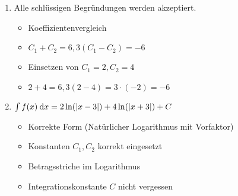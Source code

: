 \item
	\begin{enumerate}
	
	\item Alle schlüssigen Begründungen werden akzeptiert.
		\begin{itemize}
			\item Koeffizientenvergleich
			\item $C_1+C_2 = 6, 3(C_1-C_2)=-6$
			\item Einsetzen von $C_1=2, C_2 = 4$
			\item $2+4=6, 3(2-4)=3\cdot(-2)=-6$
		\end{itemize}
	
	\item $\int f(x) \:\mathrm{d}{x} = 2 \ln(|x-3|) + 4 \ln(|x+3|) + C$
		\begin{itemize}
			\item Korrekte Form (Natürlicher Logarithmus mit Vorfaktor)
			\item Konstanten $C_1, C_2$ korrekt eingesetzt
			\item Betragsstriche im Logarithmus
			\item Integrationskonstante $C$ nicht vergessen
		\end{itemize}
		
	\end{enumerate}
